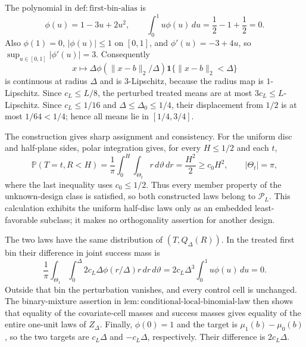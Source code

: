 The polynomial in \(\mathrm{def:first\text{-}bin\text{-}alias}\) is
\[
 \phi(u)=1-3u+2u^2,
 \qquad
 \int_0^1u\phi(u)\,du=\frac12-1+\frac12=0.
\]
Also \(\phi(1)=0\), \(|\phi(u)|\leq1\) on \([0,1]\), and \(\phi'(u)=-3+4u\), so \(\sup_{u\in[0,1]}|\phi'(u)|=3\).  Consequently
\[
 x\longmapsto \Delta\phi(\lVert x-b\rVert_2/\Delta)
 \mathbf1\{\lVert x-b\rVert_2<\Delta\}
\]
is continuous at radius \(\Delta\) and is \(3\)-Lipschitz, because the radius map is \(1\)-Lipschitz.  Since \(c_L\leq L/8\), the perturbed treated means are at most \(3c_L\leq L\)-Lipschitz.  Since \(c_L\leq1/16\) and \(\Delta\leq\Delta_0\leq1/4\), their displacement from \(1/2\) is at most \(1/64<1/4\); hence all means lie in \([1/4,3/4]\).

The construction gives sharp assignment and consistency.  For the uniform disc and half-plane sides, polar integration gives, for every \(H\leq1/2\) and each \(t\),
\[
 \mathbb P(T=t,R<H)=\frac1\pi\int_0^H\int_{\Theta_t}r\,d\vartheta\,dr
 =\frac{H^2}{2}\geq c_0H^2,
 \qquad |\Theta_t|=\pi,
\]
where the last inequality uses \(c_0\leq1/2\).  Thus every member property of the unknown-design class is satisfied, so both constructed laws belong to \(\mathcal P_L\).  This calculation exhibits the uniform half-disc laws only as an embedded least-favorable subclass; it makes no orthogonality assertion for another design.

The two laws have the same distribution of \((T,Q_\Delta(R))\).  In the treated first bin their difference in joint success mass is
\[
 \frac1\pi\int_{\Theta_1}\int_0^\Delta
 2c_L\Delta\phi(r/\Delta)r\,dr\,d\vartheta
 =2c_L\Delta^3\int_0^1u\phi(u)\,du=0.
\]
Outside that bin the perturbation vanishes, and every control cell is unchanged.  The binary-mixture assertion in \(\mathrm{lem:conditional\text{-}local\text{-}binomial\text{-}law}\) then shows that equality of the covariate-cell masses and success masses gives equality of the entire one-unit laws of \(Z_\Delta\).  Finally, \(\phi(0)=1\) and the target is \(\mu_1(b)-\mu_0(b)\), so the two targets are \(c_L\Delta\) and \(-c_L\Delta\), respectively.  Their difference is \(2c_L\Delta\).